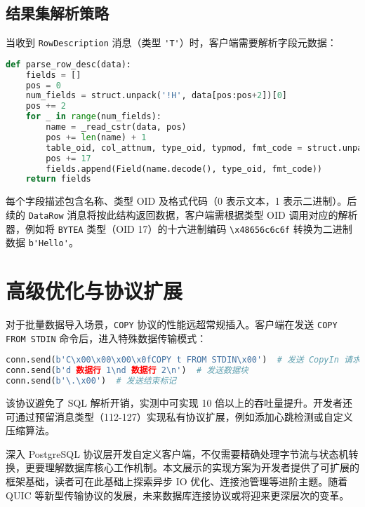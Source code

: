 \section{结果集解析策略}
当收到 \verb!RowDescription! 消息（类型 \verb!'T'!）时，客户端需要解析字段元数据：\par
\begin{lstlisting}[language=python]
def parse_row_desc(data):
    fields = []
    pos = 0
    num_fields = struct.unpack('!H', data[pos:pos+2])[0]
    pos += 2
    for _ in range(num_fields):
        name = _read_cstr(data, pos)
        pos += len(name) + 1
        table_oid, col_attnum, type_oid, typmod, fmt_code = struct.unpack('!IHIHh', data[pos:pos+17])
        pos += 17
        fields.append(Field(name.decode(), type_oid, fmt_code))
    return fields
\end{lstlisting}
每个字段描述包含名称、类型 OID 及格式代码（0 表示文本，1 表示二进制）。后续的 \verb!DataRow! 消息将按此结构返回数据，客户端需根据类型 OID 调用对应的解析器，例如将 \verb!BYTEA! 类型（OID 17）的十六进制编码 \verb!\x48656c6c6f! 转换为二进制数据 \verb!b'Hello'!。\par
\chapter{高级优化与协议扩展}
对于批量数据导入场景，\verb!COPY! 协议的性能远超常规插入。客户端在发送 \verb!COPY FROM STDIN! 命令后，进入特殊数据传输模式：\par
\begin{lstlisting}[language=python]
conn.send(b'C\x00\x00\x00\x0fCOPY t FROM STDIN\x00')  # 发送 CopyIn 请求
conn.send(b'd 数据行 1\nd 数据行 2\n')  # 发送数据块
conn.send(b'\.\x00')  # 发送结束标记
\end{lstlisting}
该协议避免了 SQL 解析开销，实测中可实现 10 倍以上的吞吐量提升。开发者还可通过预留消息类型（112-127）实现私有协议扩展，例如添加心跳检测或自定义压缩算法。\par
深入 PostgreSQL 协议层开发自定义客户端，不仅需要精确处理字节流与状态机转换，更要理解数据库核心工作机制。本文展示的实现方案为开发者提供了可扩展的框架基础，读者可在此基础上探索异步 IO 优化、连接池管理等进阶主题。随着 QUIC 等新型传输协议的发展，未来数据库连接协议或将迎来更深层次的变革。\par

